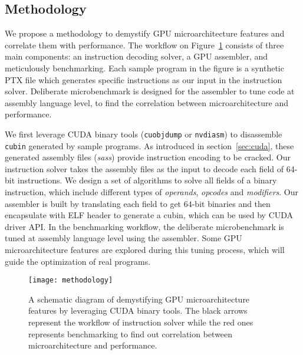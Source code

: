 \subsection{Methodology}

We propose a methodology to demystify GPU microarchitecture features and correlate them with performance.
The workflow on Figure~\ref{fig:workflow} consists of three main components: an instruction decoding solver, a GPU assembler, and meticulously
benchmarking. %
Each sample program in the figure is a synthetic PTX file which generates specific instructions as our input in the instruction solver. %
Deliberate microbenchmark is designed for the assembler to tune code at assembly language level, to find the correlation
between microarchitecture and performance.

We first leverage CUDA binary tools ({\tt cuobjdump} or {\tt nvdiasm}) to disassemble {\tt cubin} generated by sample programs. %
As introduced in section~\ref{sec:cuda}, these generated assembly files ({\em sass}) provide instruction encoding to be cracked.
Our instruction solver takes the assembly files as the input to decode each field of 64-bit instructions.
We design a set of algorithms to solve all fields of a binary instruction, which include different types of {\em operands}, {\em opcodes} and {\em modifiers}.
Our assembler is built by translating each field to get $64$-bit binaries and then encapsulate with ELF header to
generate a cubin, which can be used by CUDA driver API.
In the benchmarking workflow, the deliberate microbenchmark is tuned at assembly language level using the assembler.
Some GPU microarchitecture features are explored during this tuning process, which will guide the optimization of real programs.


\begin{figure}[htbp]
\begin{center}
\texttt{[image: methodology]}
\caption{A schematic diagram of demystifying GPU microarchitecture features by leveraging CUDA binary tools. The black arrows
represent the workflow of instruction solver while the red ones represents benchmarking to find out correlation between microarchitecture
    and performance.}%
\label{fig:workflow}
\end{center}
\end{figure}
